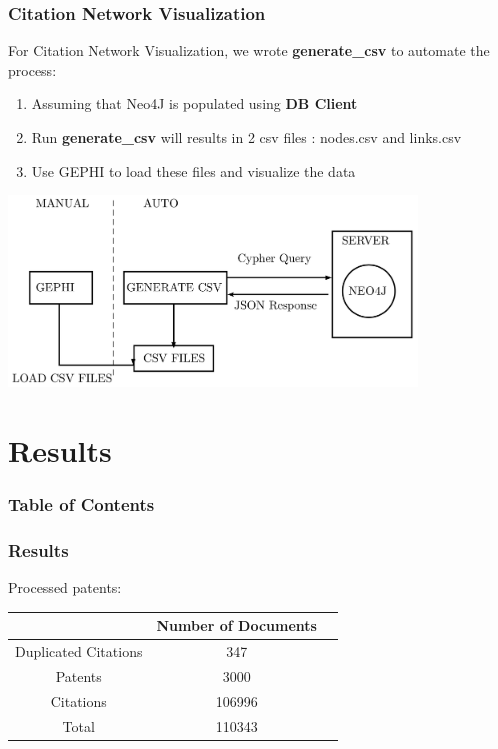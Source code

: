 \documentclass{beamer}
\begin{document}
\begin{frame}
\frametitle{Citation Network Visualization}
For Citation Network Visualization, we wrote \textbf{generate\_csv} to automate the process:
\begin{enumerate}
\item Assuming that Neo4J is populated using \textbf{DB Client}
\item Run \textbf{generate\_csv} will results in 2 csv files : nodes.csv and links.csv
\item Use GEPHI to load these files and visualize the data
\end{enumerate}
\begin{center}
\includegraphics[height=2in]{gephi.png}
\end{center}
\end{frame}

\section{Results}
\begin{frame}
\frametitle{Table of Contents}
\tableofcontents[currentsection]
\end{frame}

\begin{frame}
\frametitle{Results}
Processed patents:
\begin{table}[htd]
\begin{tabular}{|c|c|l|} \hline
 &Number of Documents\\ \hline
 Duplicated Citations&347 \\ \hline
Patents&3000 \\ \hline
Citations&106996 \\ \hline
Total & 110343\\ \hline
\end{tabular}
\end{table}
\end{frame}
\end{document}
